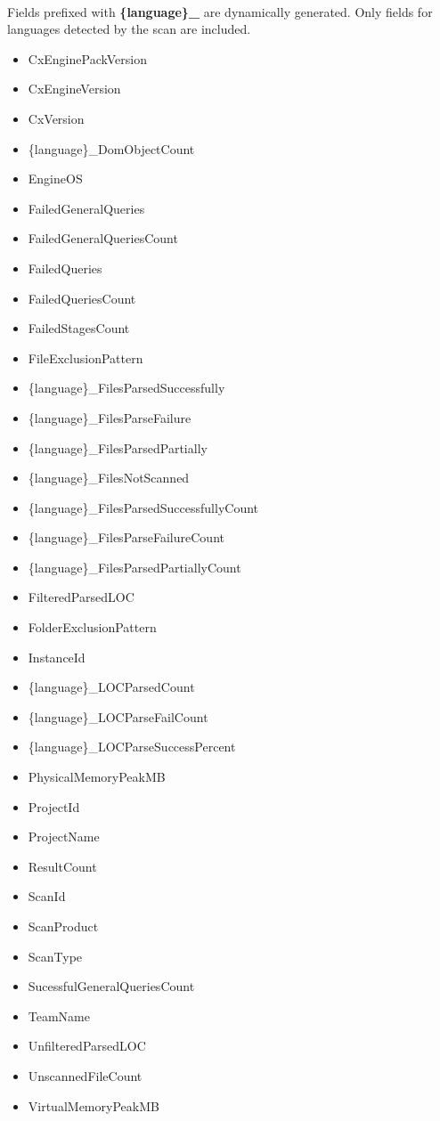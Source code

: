 \noindent\\Fields prefixed with \textbf{\{language\}_} are dynamically generated.  Only fields for languages detected by the scan are included.

\begin{itemize}

    \item CxEnginePackVersion
    \item CxEngineVersion
    \item CxVersion
    \item \{language\}_DomObjectCount
    \item EngineOS
    \item FailedGeneralQueries
    \item FailedGeneralQueriesCount
    \item FailedQueries
    \item FailedQueriesCount
    \item FailedStagesCount
    \item FileExclusionPattern
    \item \{language\}_FilesParsedSuccessfully
    \item \{language\}_FilesParseFailure
    \item \{language\}_FilesParsedPartially
    \item \{language\}_FilesNotScanned
    \item \{language\}_FilesParsedSuccessfullyCount
    \item \{language\}_FilesParseFailureCount
    \item \{language\}_FilesParsedPartiallyCount
    \item FilteredParsedLOC
    \item FolderExclusionPattern
    \item InstanceId
    \item \{language\}_LOCParsedCount
    \item \{language\}_LOCParseFailCount
    \item \{language\}_LOCParseSuccessPercent
    \item PhysicalMemoryPeakMB
    \item ProjectId
    \item ProjectName
    \item ResultCount
    \item ScanId
    \item ScanProduct
    \item ScanType
    \item SucessfulGeneralQueriesCount
    \item TeamName
    \item UnfilteredParsedLOC
    \item UnscannedFileCount
    \item VirtualMemoryPeakMB
\end{itemize}


